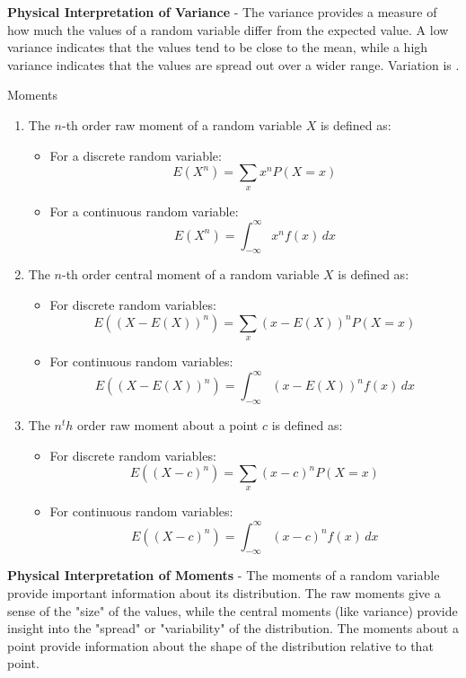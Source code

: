 \documentclass[openany]{book}
\begin{document}
\textbf{Physical Interpretation of Variance} - The variance provides a measure of how much the values of a random variable differ from the expected value. A low variance indicates that the values tend to be close to the mean, while a high variance indicates that the values are spread out over a wider range. Variation is .
\begin{mydefinition}{Moments}
    \begin{enumerate}
    \item The $n$-th order raw moment of a random variable $X$ is defined as:
    \begin{itemize}
        \item For a discrete random variable:
        $$E(X^n) = \sum_{x} x^n P(X = x)$$
        \item For a continuous random variable:
        $$E(X^n) = \int_{-\infty}^{\infty} x^n f(x) \, dx$$
    \end{itemize}
    \item The $n$-th order central moment of a random variable $X$ is defined as:
    \begin{itemize}
    \item For discrete random variables: 
    $$E((X - E(X))^n) = \sum_{x} (x - E(X))^n P(X = x)$$
    \item For continuous random variables:
    $$E((X - E(X))^n) = \int_{-\infty}^{\infty} (x - E(X))^n f(x) \, dx$$
    \end{itemize}
    
    \item The $n^th$ order raw moment about a point $c$ is defined as:
    \begin{itemize}
        \item For discrete random variables:
        $$E((X - c)^n) = \sum_{x} (x - c)^n P(X = x)$$
        \item For continuous random variables:
        $$E((X - c)^n) = \int_{-\infty}^{\infty} (x - c)^n f(x) \, dx$$
    \end{itemize}
    \end{enumerate}
\end{mydefinition}
\textbf{Physical Interpretation of Moments} - The moments of a random variable provide important information about its distribution. The raw moments give a sense of the "size" of the values, while the central moments (like variance) provide insight into the "spread" or "variability" of the distribution.
The moments about a point provide information about the shape of the distribution relative to that point. 
\end{document}
